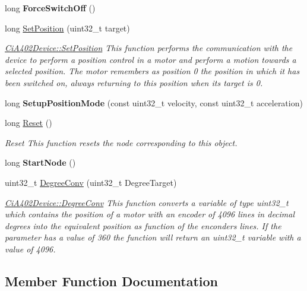 \begin{DoxyCompactItemize}
long {\bfseries Force\+Switch\+Off} ()
\item 
long \hyperlink{classCiA402Device_acb2d6cc96a8a613f9c2791e87344ba0d}{Set\+Position} (uint32\+\_\+t target)
\begin{DoxyCompactList}\small\item\em \hyperlink{classCiA402Device_acb2d6cc96a8a613f9c2791e87344ba0d}{Ci\+A402\+Device\+::\+Set\+Position} This function performs the communication with the device to perform a position control in a motor and perform a motion towards a selected position. The motor remembers as position 0 the position in which it has been switched on, always returning to this position when its target is 0. \end{DoxyCompactList}\item 
\mbox{\label{classCiA402Device_a221dbc5461823097981727a3baff5d0c}} 
long {\bfseries Setup\+Position\+Mode} (const uint32\+\_\+t velocity, const uint32\+\_\+t acceleration)
\item 
long \hyperlink{classCiA402Device_ac4a6e4987ebe075d0ac07ee5fd4d410c}{Reset} ()
\begin{DoxyCompactList}\small\item\em Reset This function resets the node corresponding to this object. \end{DoxyCompactList}\item 
\mbox{\label{classCiA402Device_a32b4628098364846fe291312025f6fda}} 
long {\bfseries Start\+Node} ()
\item 
uint32\+\_\+t \hyperlink{classCiA402Device_a485eaa3cbd186b6f29caf588c7010023}{Degree\+Conv} (uint32\+\_\+t Degree\+Target)
\begin{DoxyCompactList}\small\item\em \hyperlink{classCiA402Device_a485eaa3cbd186b6f29caf588c7010023}{Ci\+A402\+Device\+::\+Degree\+Conv} This function converts a variable of type uint32\+\_\+t which contains the position of a motor with an encoder of 4096 lines in decimal degrees into the equivalent position as function of the enconders lines. If the parameter has a value of 360 the function will return an uint32\+\_\+t variable with a value of 4096. \end{DoxyCompactList}\end{DoxyCompactItemize}


\subsection{Member Function Documentation}
\mbox{\label{classCiA402Device_a5a034b00c87d2ec9ec98157b772465d9}} 
